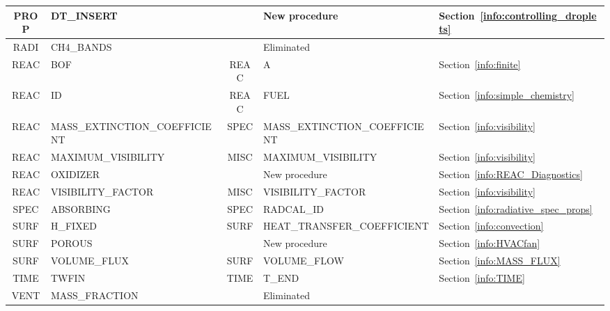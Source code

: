 \documentclass[11pt]{book}
\begin{document}
\begin{table}
\begin{tabular}{@{\extracolsep{\fill}}|c|l|c|l|l|}
{\ct PROP}    & {\ct DT\_INSERT}                    &              & New procedure                               & Section~\ref{info:controlling_droplets} \\ \hline
{\ct RADI}    & {\ct CH4\_BANDS}                    &              & Eliminated                                  &                                         \\ \hline
{\ct REAC}    & {\ct BOF}                           &  {\ct REAC}  & {\ct A}                                     & Section~\ref{info:finite}               \\ \hline
{\ct REAC}    & {\ct ID}                            &  {\ct REAC}  & {\ct FUEL}                                  & Section~\ref{info:simple_chemistry}     \\ \hline
{\ct REAC}    & {\ct MASS\_EXTINCTION\_COEFFICIENT} &  {\ct SPEC}  & {\ct MASS\_EXTINCTION\_COEFFICIENT}         & Section~\ref{info:visibility}           \\ \hline
{\ct REAC}    & {\ct MAXIMUM\_VISIBILITY}           &  {\ct MISC}  & {\ct MAXIMUM\_VISIBILITY}                   & Section~\ref{info:visibility}           \\ \hline
{\ct REAC}    & {\ct OXIDIZER}                      &              & New procedure                               & Section~\ref{info:REAC_Diagnostics}     \\ \hline
{\ct REAC}    & {\ct VISIBILITY\_FACTOR}            &  {\ct MISC}  & {\ct VISIBILITY\_FACTOR}                    & Section~\ref{info:visibility}           \\ \hline
{\ct SPEC}    & {\ct ABSORBING}                     &  {\ct SPEC}  & {\ct RADCAL\_ID }                           & Section~\ref{info:radiative_spec_props} \\ \hline
{\ct SURF}    & {\ct H\_FIXED}                      &  {\ct SURF}  & {\ct HEAT\_TRANSFER\_COEFFICIENT}           & Section~\ref{info:convection}           \\ \hline
{\ct SURF}    & {\ct POROUS}                        &              & New procedure                               & Section~\ref{info:HVACfan}              \\ \hline
{\ct SURF}    & {\ct VOLUME\_FLUX}                  &  {\ct SURF}  & {\ct VOLUME\_FLOW}                          & Section~\ref{info:MASS_FLUX}            \\ \hline
{\ct TIME}    & {\ct TWFIN}                         &  {\ct TIME}  & {\ct T\_END}                                & Section~\ref{info:TIME}                 \\ \hline
{\ct VENT}    & {\ct MASS\_FRACTION}                &              & Eliminated                                  &                                         \\ \hline
\end{tabular}
\end{table}
\end{document}
